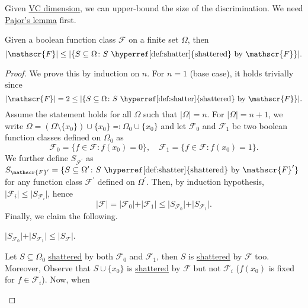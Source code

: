 Given \hyperref[def:VC-dimension]{VC dimension}, we can upper-bound the size of the discrimination. We need \hyperref[lma:Pajor]{Pajor's lemma} first.

\begin{lemma}\label{lma:Pajor}
	Given a boolean function class \(\mathscr{F} \) on a finite set \(\Omega \), then
	\[
		\vert \mathscr{F} \vert \leq \vert \{ S \subseteq \Omega \colon S \text{ \hyperref[def:shatter]{shattered} by } \mathscr{F} \} \vert.
	\]
\end{lemma}
\begin{proof}
	We prove this by induction on \(n\). For \(n = 1\) (base case), it holds trivially since
	\[
		\vert \mathscr{F} \vert = 2 \leq \vert \{ S \subseteq \Omega \colon S \text{ \hyperref[def:shatter]{shattered} by } \mathscr{F} \} \vert.
	\]
	Assume the statement holds for all \(\Omega \) such that \(\vert \Omega \vert = n\). For \(\vert \Omega \vert = n+1\), we write \(\Omega = (\Omega \setminus \{ x_0 \} ) \cup \{ x_0 \} \eqqcolon \Omega _0 \cup \{ x_0 \}\) and let \(\mathscr{F} _0\) and \(\mathscr{F} _1\) be two boolean function classes defined on \(\Omega _0\) as
	\[
		\mathscr{F} _0 = \{ f\in \mathscr{F} \colon f(x_0) = 0\} ,\quad
		\mathscr{F} _1 = \{ f\in \mathscr{F} \colon f(x_0) = 1\} .
	\]
	We further define \(S_{\mathscr{F} ^{\prime} }\) as \(S_{\mathscr{F} ^{\prime} } = \{ S \subseteq \Omega ^{\prime} \colon S \text{ \hyperref[def:shatter]{shattered} by } \mathscr{F} ^{\prime} \}\) for any function class \(\mathscr{F} ^{\prime} \) defined on \(\Omega ^{\prime} \). Then, by induction hypothesis, \(\vert \mathscr{F} _i \vert \leq \vert S_{\mathscr{F} _i} \vert \), hence
	\[
		\vert \mathscr{F} \vert = \vert \mathscr{F} _0 \vert + \vert \mathscr{F} _1 \vert \leq \vert S_{\mathscr{F} _0} \vert + \vert S_{\mathscr{F} _1} \vert.
	\]
	Finally, we claim the following.
	\begin{claim}
		\(\vert S_{\mathscr{F} _0} \vert + \vert S_{\mathscr{F} _1} \vert \leq \vert S _{\mathscr{F} } \vert\).
	\end{claim}
	\begin{explanation}
		Let \(S \subseteq \Omega _0\) \hyperref[def:shatter]{shattered} by both \(\mathscr{F} _0\) and \(\mathscr{F} _1\), then \(S\) is \hyperref[def:shatter]{shattered} by \(\mathscr{F} \) too. Moreover, Observe that \(S \cup \{ x_0 \} \) is \hyperref[def:shatter]{shattered} by \(\mathscr{F} \) but not \(\mathscr{F} _i\) (\(f(x_0)\) is fixed for \(f\in \mathscr{F} _i\)). Now, when
		\begin{itemize}

\end{itemize}
\end{explanation}
\end{proof}
